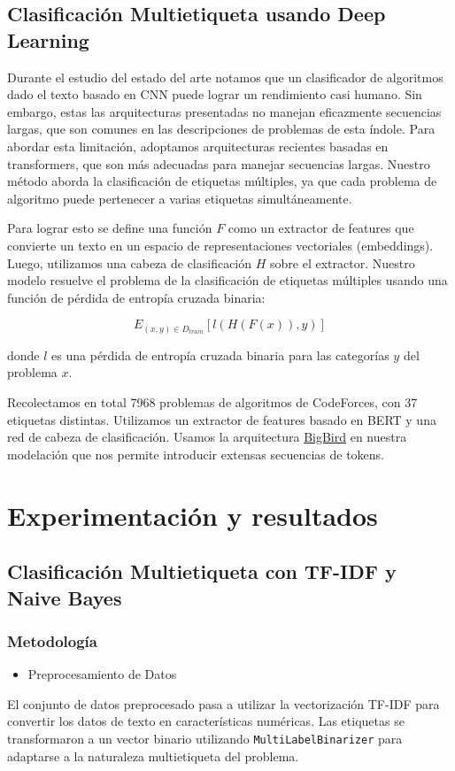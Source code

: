 \documentclass{article}
\begin{document}
\subsection{Clasificación Multietiqueta usando Deep Learning}

Durante el estudio del estado del arte notamos que un clasificador de algoritmos dado el texto 
basado en CNN puede lograr un rendimiento casi humano. Sin embargo, estas las arquitecturas 
presentadas no manejan eficazmente secuencias largas, que son comunes en las descripciones de 
problemas de esta índole. Para abordar esta limitación, adoptamos arquitecturas recientes 
basadas en transformers, que son más adecuadas para manejar secuencias largas. Nuestro método 
aborda la clasificación de etiquetas múltiples, ya que cada problema de algoritmo puede 
pertenecer a varias etiquetas simultáneamente.

Para lograr esto se define una función $F$ como un extractor de features que convierte un 
texto en un espacio de representaciones vectoriales (embeddings). Luego, utilizamos una cabeza 
de clasificación $H$ sobre el extractor. Nuestro modelo resuelve el problema de la 
clasificación de etiquetas múltiples usando una función de pérdida de entropía cruzada binaria:

$$
    E_{(x, y) \in D_{train}} [ l(H(F(x)), y) ]
$$

donde $l$ es una pérdida de entropía cruzada binaria para las categorías $y$ del problema $x$.

Recolectamos en total 7968 problemas de algoritmos de CodeForces, con 37 etiquetas distintas. 
Utilizamos un extractor de features basado en BERT y una red de cabeza de 
clasificación. Usamos la arquitectura \href{https://huggingface.co/google/bigbird-roberta-base}{BigBird} 
en nuestra modelación que nos permite introducir extensas secuencias de tokens.

\section{Experimentación y resultados}

\subsection{Clasificación Multietiqueta con TF-IDF y Naive Bayes}
\subsubsection{Metodología}
\begin{itemize}
    \item Preprocesamiento de Datos
\end{itemize}
El conjunto de datos preprocesado pasa a utilizar la vectorización TF-IDF para convertir los datos de texto en características numéricas. Las etiquetas se transformaron a un vector binario utilizando \texttt{MultiLabelBinarizer} para adaptarse a la naturaleza multietiqueta del problema.
\end{document}
